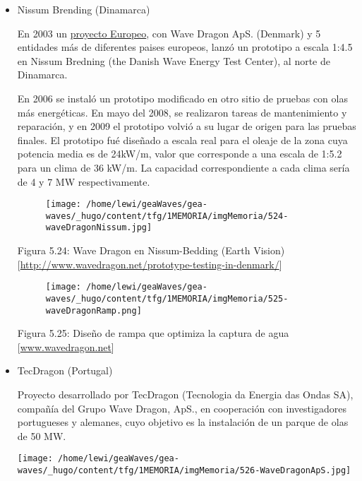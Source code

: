 \begin{itemize}
  \begin{itemize}
  \item
    Nissum Brending (Dinamarca)

    En 2003 un
    \href{\%5Bhttp://www.wavedragon.net/sea-testing-and-optimisation-of-power-production-on-a-scale-14-5-test-rig-of-the-offshore-wave-energy-converter-wave-dragon/}{proyecto
    Europeo}, con Wave Dragon ApS. (Denmark) y 5 entidades más de
    diferentes paises europeos, lanzó un prototipo a escala 1:4.5 en
    Nissum Bredning (the Danish Wave Energy Test Center), al norte de
    Dinamarca.

    En 2006 se instaló un prototipo modificado en otro sitio de pruebas
    con olas más energéticas. En mayo del 2008, se realizaron tareas de
    mantenimiento y reparación, y en 2009 el prototipo volvió a su lugar
    de origen para las pruebas finales. El prototipo fué diseñado a
    escala real para el oleaje de la zona cuya potencia media es de
    24kW/m, valor que corresponde a una escala de 1:5.2 para un clima de
    36 kW/m. La capacidad correspondiente a cada clima sería de 4 y 7 MW
    respectivamente.

    \begin{figure}
    \centering
    \texttt{[image: /home/lewi/geaWaves/gea-waves/\_hugo/content/tfg/1MEMORIA/imgMemoria/524-waveDragonNissum.jpg]}
    \caption{}
    \end{figure}

    Figura 5.24: Wave Dragon en Nissum-Bedding (Earth Vision)
    {[}\url{http://www.wavedragon.net/prototype-testing-in-denmark/}{]}

    \begin{figure}
    \centering
    \texttt{[image: /home/lewi/geaWaves/gea-waves/\_hugo/content/tfg/1MEMORIA/imgMemoria/525-waveDragonRamp.png]}
    \caption{}
    \end{figure}

    Figura 5.25: Diseño de rampa que optimiza la captura de agua
    {[}\url{www.wavedragon.net}{]} 
  \item
    TecDragon (Portugal)

    Proyecto desarrollado por TecDragon (Tecnologia da Energia das Ondas
    SA), compañía del Grupo Wave Dragon, ApS., en cooperación con
    investigadores portugueses y alemanes, cuyo objetivo es la
    instalación de un parque de olas de 50 MW.

    \texttt{[image: /home/lewi/geaWaves/gea-waves/\_hugo/content/tfg/1MEMORIA/imgMemoria/526-WaveDragonApS.jpg]}


\end{itemize}
\end{itemize}
